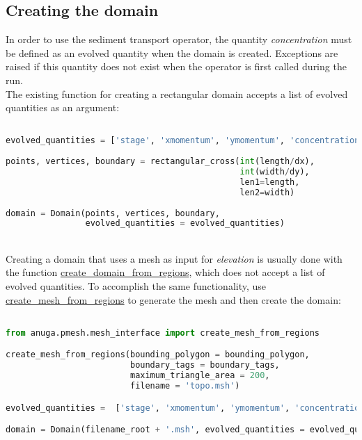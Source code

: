 \documentclass[10pt]{article}
\begin{document}
\subsection{Creating the domain}\label{domain}

In order to use the sediment transport operator, the quantity \textit{concentration} must be defined as an evolved quantity when the domain is created. Exceptions are raised if this quantity does not exist when the operator is first called during the run.
\ \\

The existing function for creating a rectangular domain accepts a list of evolved quantities as an argument:

\begin{minipage}[c]{0.95\textwidth}
\begin{lstlisting}[language=Python, title=Creating a rectangular domain]

evolved_quantities = ['stage', 'xmomentum', 'ymomentum', 'concentration']
			  
points, vertices, boundary = rectangular_cross(int(length/dx),
									    	   int(width/dy),
									    	   len1=length,
									    	   len2=width)
                                                  	
domain = Domain(points, vertices, boundary,
				evolved_quantities = evolved_quantities)

\end{lstlisting}
\end{minipage}
\ \\

Creating a domain that uses a mesh as input for \textit{elevation} is usually done with the function \url{create_domain_from_regions}, which does not accept a list of evolved quantities. To accomplish the same functionality, use \url{create_mesh_from_regions} to generate the mesh and then create the domain:

\begin{minipage}[c]{0.95\textwidth}
\begin{lstlisting}[language=Python, title=Creating a domain from a mesh file]

from anuga.pmesh.mesh_interface import create_mesh_from_regions

create_mesh_from_regions(bounding_polygon = bounding_polygon,
                         boundary_tags = boundary_tags,
                         maximum_triangle_area = 200,
                         filename = 'topo.msh')

evolved_quantities =  ['stage', 'xmomentum', 'ymomentum', 'concentration']

domain = Domain(filename_root + '.msh', evolved_quantities = evolved_quantities)


\end{lstlisting}
\end{minipage}
\ \\ \ \\
\end{document}
